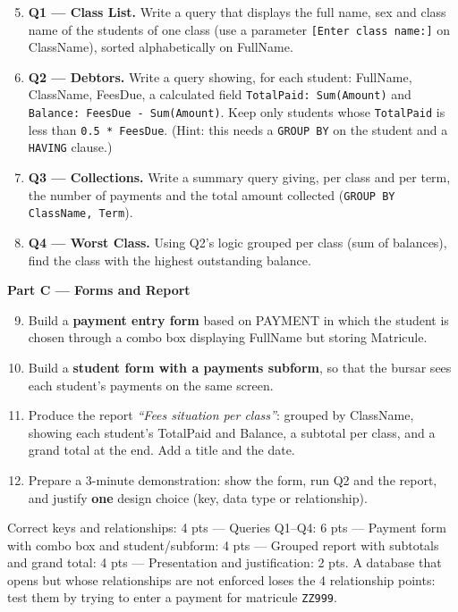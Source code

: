 \documentclass[11pt]{article}
\newcommand{\cle}[1]{{\popxbold\color{popdark}#1}}
\begin{document}
\begin{enumerate}
\setcounter{enumi}{4}
\item \textbf{Q1 — Class List.} Write a query that displays the full name, sex and class name of the students of one class (use a \cle{parameter} \texttt{[Enter class name:]} on ClassName), sorted alphabetically on FullName.
\item \textbf{Q2 — Debtors.} Write a query showing, for each student: FullName, ClassName, FeesDue, a calculated field \texttt{TotalPaid: Sum(Amount)} and \texttt{Balance: FeesDue - Sum(Amount)}. Keep only students whose \texttt{TotalPaid} is less than \texttt{0.5 * FeesDue}. (Hint: this needs a \texttt{GROUP BY} on the student and a \texttt{HAVING} clause.)
\item \textbf{Q3 — Collections.} Write a summary query giving, per class and per term, the number of payments and the total amount collected (\texttt{GROUP BY ClassName, Term}).
\item \textbf{Q4 — Worst Class.} Using Q2's logic grouped per class (sum of balances), find the class with the highest outstanding balance.
\end{enumerate}

\textbf{Part C — Forms and Report}

\begin{enumerate}
\setcounter{enumi}{8}
\item Build a \textbf{payment entry form} based on PAYMENT in which the student is chosen through a \cle{combo box} displaying FullName but storing Matricule.
\item Build a \textbf{student form with a payments subform}, so that the bursar sees each student's payments on the same screen.
\item Produce the report \emph{``Fees situation per class''}: grouped by ClassName, showing each student's TotalPaid and Balance, a \cle{subtotal} per class, and a \cle{grand total} at the end. Add a title and the date.
\item Prepare a 3-minute demonstration: show the form, run Q2 and the report, and justify \textbf{one} design choice (key, data type or relationship).
\end{enumerate}

\begin{attention}
Correct keys and relationships: 4 pts — Queries Q1–Q4: 6 pts — Payment form with combo box and student/subform: 4 pts — Grouped report with subtotals and grand total: 4 pts — Presentation and justification: 2 pts. A database that opens but whose relationships are not enforced loses the 4 relationship points: test them by trying to enter a payment for matricule \texttt{ZZ999}.
\end{attention}
\end{document}
